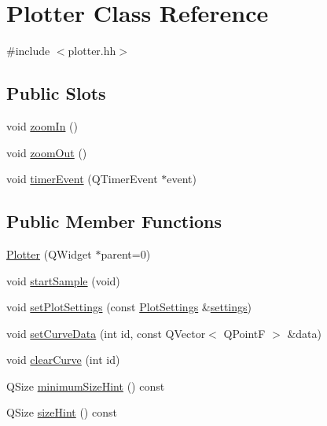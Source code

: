 \hypertarget{class_plotter}{\section{\-Plotter \-Class \-Reference}
\label{class_plotter}
}


{\ttfamily \#include $<$plotter.\-hh$>$}

\subsection*{\-Public \-Slots}
\begin{DoxyCompactItemize}
\item 
void \hyperlink{class_plotter_a6fa3194176578784291b812b18380306}{zoom\-In} ()
\item 
void \hyperlink{class_plotter_ac21dbd314180f9e5f3ba6c049577df1b}{zoom\-Out} ()
\item 
void \hyperlink{class_plotter_a63aa82ff02f2ff644403dfa4575c439b}{timer\-Event} (\-Q\-Timer\-Event $\ast$event)
\end{DoxyCompactItemize}
\subsection*{\-Public \-Member \-Functions}
\begin{DoxyCompactItemize}
\item 
\hyperlink{class_plotter_a367b6890c36910a27ec710ac3693e64b}{\-Plotter} (\-Q\-Widget $\ast$parent=0)
\item 
void \hyperlink{class_plotter_a19e4b1df2b506660fdfff2c52ed6d4fc}{start\-Sample} (void)
\item 
void \hyperlink{class_plotter_a1eef69d8478a2639d6f968b8cfaeeda0}{set\-Plot\-Settings} (const \hyperlink{class_plot_settings}{\-Plot\-Settings} \&\hyperlink{gqgmc_8cc_ab4595a4c5785577c2fe2b882ba3d74f8}{settings})
\item 
void \hyperlink{class_plotter_ad3463aa743cc04f7e7bfdefe4ec0165b}{set\-Curve\-Data} (int id, const \-Q\-Vector$<$ \-Q\-Point\-F $>$ \&data)
\item 
void \hyperlink{class_plotter_a1c1975e2c8dcf9c8efadd5de34065211}{clear\-Curve} (int id)
\item 
\-Q\-Size \hyperlink{class_plotter_a611d88bb9e51ce9baf2fd97275c1c6ae}{minimum\-Size\-Hint} () const 
\item 
\-Q\-Size \hyperlink{class_plotter_a030b4cb40353aa3c325ae810fc21a0bd}{size\-Hint} () const 
\end{DoxyCompactItemize}
